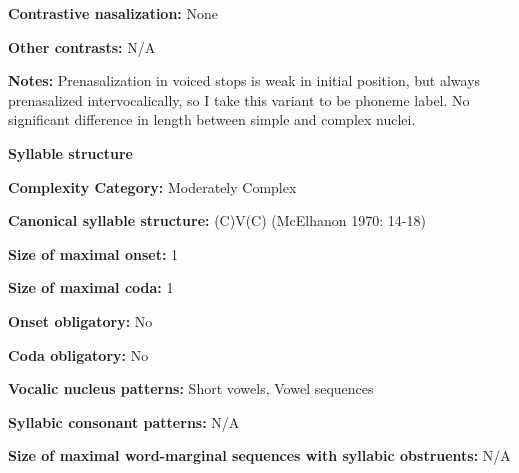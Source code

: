 \begin{styleBody}
\textbf{Contrastive nasalization:} None
\end{styleBody}

\begin{styleBody}
\textbf{Other contrasts:} N/A
\end{styleBody}

\begin{styleBody}
\textbf{Notes:} Prenasalization in voiced stops is weak in initial position, but always prenasalized intervocalically, so I take this variant to be phoneme label. No significant difference in length between simple and complex nuclei.
\end{styleBody}

\begin{styleBody}
\textbf{Syllable structure}
\end{styleBody}

\begin{styleBody}
\textbf{Complexity Category:} Moderately Complex
\end{styleBody}

\begin{styleBody}
\textbf{Canonical syllable structure: }(C)V(C) (McElhanon 1970: 14-18)
\end{styleBody}

\begin{styleBody}
\textbf{Size of maximal onset:} 1
\end{styleBody}

\begin{styleBody}
\textbf{Size of maximal coda:} 1
\end{styleBody}

\begin{styleBody}
\textbf{Onset obligatory:} No
\end{styleBody}

\begin{styleBody}
\textbf{Coda obligatory:} No
\end{styleBody}

\begin{styleBody}
\textbf{Vocalic nucleus patterns:} Short vowels, Vowel sequences
\end{styleBody}

\begin{styleBody}
\textbf{Syllabic consonant patterns:} N/A
\end{styleBody}

\begin{styleBody}
\textbf{Size of maximal word{}-marginal sequences with syllabic obstruents:} N/A
\end{styleBody}

